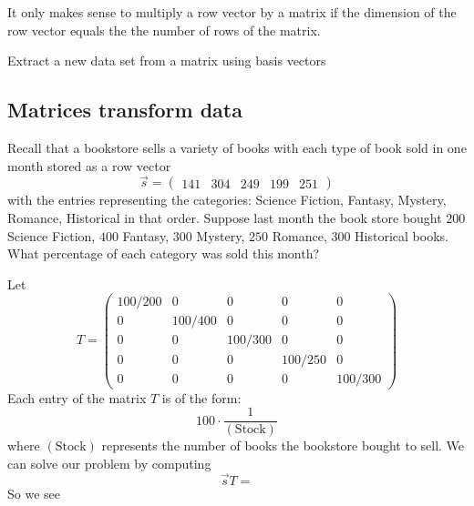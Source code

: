 \documentclass{ximera}
\begin{document}
\begin{warning}
  It only makes sense to multiply a row vector by a matrix if the
  dimension of the row vector equals the the number of rows of the
  matrix.
\end{warning}

\begin{example}
Extract a new data set from a matrix using basis vectors
\end{example}


\begin{example}
\end{example}



\subsection{Matrices transform data}


\begin{example}
  Recall that a bookstore sells a variety of books with each type of
  book sold in one month stored as a row vector
  \[
  \vec{s} = \begin{pmatrix}141 & 304 & 249 & 199 & 251 \end{pmatrix}
  \]
  with the entries representing the categories: Science Fiction,
  Fantasy, Mystery, Romance, Historical in that order.  Suppose last
  month the book store bought $200$ Science Fiction, $400$ Fantasy, $300$
  Mystery, $250$ Romance, $300$ Historical books. What percentage of each
  category was sold this month?
  \begin{explanation}
    Let
    \[
    T =
    \begin{pmatrix}
      100/200 & 0 &    0   &   0    &   0 \\
      0 & 100/400 &    0   &   0    &   0 \\
      0 &   0   &  100/300 &   0    &   0 \\
      0 &   0   &    0   & 100/250  &   0 \\
      0 &   0   &    0   &   0    & 100/300
    \end{pmatrix}
    \]
    Each entry of the matrix $T$ is of the form:
    \[
    100 \cdot \frac{1}{(\text{Stock})}
    \]
    where $(\text{Stock})$ represents the number of books the
    bookstore bought to sell.  We can solve our problem by computing
    \[
    \vec{s} T =
    \]
    So we see
  \end{explanation}

\end{example}
\end{document}
